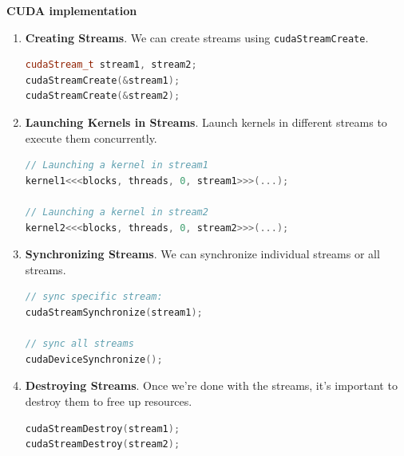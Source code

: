 \highspace
\begin{flushleft}
    \textcolor{Green3}{ \textbf{CUDA implementation}}
\end{flushleft}
\begin{enumerate}
    \item \textbf{Creating Streams}. We can create streams using \texttt{cudaStreamCreate}.
    \begin{lstlisting}[language=C++]
cudaStream_t stream1, stream2;
cudaStreamCreate(&stream1);
cudaStreamCreate(&stream2);\end{lstlisting}

    \item \textbf{Launching Kernels in Streams}. Launch kernels in different streams to execute them concurrently.
    \begin{lstlisting}[language=C++]
// Launching a kernel in stream1
kernel1<<<blocks, threads, 0, stream1>>>(...);

// Launching a kernel in stream2
kernel2<<<blocks, threads, 0, stream2>>>(...);\end{lstlisting}

    \newpage

    \item \textbf{Synchronizing Streams}. We can synchronize individual streams or all streams.
    \begin{lstlisting}[language=C++]
// sync specific stream:
cudaStreamSynchronize(stream1);

// sync all streams
cudaDeviceSynchronize();\end{lstlisting}

    \item \textbf{Destroying Streams}. Once we're done with the streams, it's important to destroy them to free up resources.
    \begin{lstlisting}[language=C++]
cudaStreamDestroy(stream1);
cudaStreamDestroy(stream2);\end{lstlisting}
\end{enumerate}

